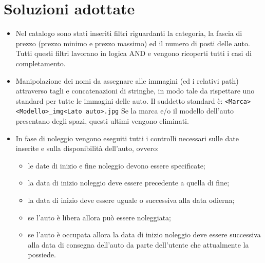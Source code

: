 \documentclass[12pt,a4paperS]{report}
\begin{document}
	\hypertarget{soluzioni}{\chapter{Soluzioni adottate}}
	\label{soluzioni}
	\begin{normalsize}
		\begin{itemize}
			\item Nel catalogo sono stati inseriti filtri riguardanti la categoria, la fascia di prezzo (prezzo minimo e prezzo massimo) ed il numero di posti delle auto.
			\newline
			Tutti questi filtri lavorano in logica AND e vengono ricoperti tutti i casi di completamento.
			\item Manipolazione dei nomi da assegnare alle immagini (ed i relativi path) attraverso tagli e concatenazioni di stringhe, in modo tale da rispettare uno standard per tutte le immagini delle auto.
			\newline
			Il suddetto standard è: \texttt{<Marca><Modello>\_img<Lato auto>.jpg}
			\newline
			Se la marca e/o il modello dell'auto presentano degli spazi, questi ultimi vengono eliminati.
			\item In fase di noleggio vengono eseguiti tutti i controlli necessari sulle date inserite e sulla disponibilità dell'auto, ovvero: 
				\begin{itemize}
					\item le date di inizio e fine noleggio devono essere specificate;
					\item la data di inizio noleggio deve essere precedente a quella di fine;
					\item la data di inizio deve essere uguale o successiva alla data odierna;
					\item se l'auto è libera allora può essere noleggiata;
					\item se l'auto è occupata allora la data di inizio noleggio deve essere successiva alla data di consegna dell'auto da parte dell'utente che attualmente la possiede.
				\end{itemize}
				    
		\end{itemize}
	\end{normalsize}
\end{document}
